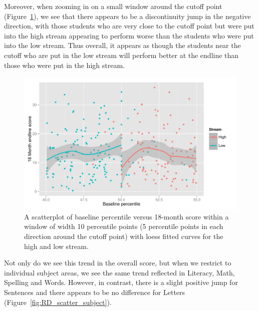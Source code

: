 \documentclass[11pt]{article}
\begin{document}
Moreover, when zooming in on a small window around the cutoff point (Figure~\ref{fig:RD_scatter}), we see that there appears to be a discontinuity jump in the negative direction, with those students who are very close to the cutoff point but were put into the high stream appearing to perform worse than the students who were put into the low stream. Thus overall, it appears as though the students near the cutoff who are put in the low stream will perform better at the endline than those who were put in the high stream.



  \begin{figure}[ht]
 \centering
 \includegraphics[scale=0.6]{RD_scatter.pdf}
 \caption{A scatterplot of baseline percentile versus 18-month score within a window of width 10 percentile points (5 percentile points in each direction around the cutoff point) with loess fitted curves for the high and low stream.}
 \label{fig:RD_scatter}
 \end{figure}
 
 Not only do we see this trend in the overall score, but when we restrict to individual subject areas, we see the same trend reflected in Literacy, Math, Spelling and Words. However, in contrast, there is a slight positive jump for Sentences and there appears to be no difference for Letters (Figure~\ref{fig:RD_scatter_subject}). \\
 
\end{document}
